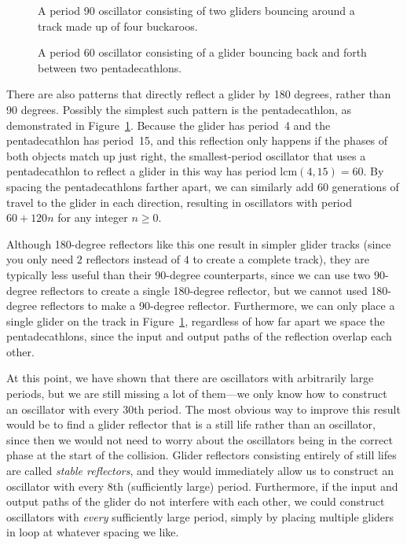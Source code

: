 \begin{figure}[!htb]
	\centering
	\begin{minipage}[b]{.45\textwidth}
		\centering{}
		\caption{A period 90 oscillator consisting of two gliders bouncing around a track made up of four buckaroos.}\label{fig:buckaroo_loop}
	\end{minipage} \hfill %
	\begin{minipage}[b]{.51\textwidth}
		\centering{}
		\caption{A period 60 oscillator consisting of a glider bouncing back and forth between two pentadecathlons.}\label{fig:relay}
	\end{minipage}
\end{figure}

There are also patterns that directly reflect a glider by 180 degrees, rather than 90 degrees. Possibly the simplest such pattern is the pentadecathlon, as demonstrated in Figure~\ref{fig:relay}. Because the glider has period~4 and the pentadecathlon has period~15, and this reflection only happens if the phases of both objects match up just right, the smallest-period oscillator that uses a pentadecathlon to reflect a glider in this way has period $\mathrm{lcm}(4,15) = 60$. By spacing the pentadecathlons farther apart, we can similarly add 60 generations of travel to the glider in each direction, resulting in oscillators with period $60 + 120n$ for any integer $n \geq 0$.

Although 180-degree reflectors like this one result in simpler glider tracks (since you only need $2$ reflectors instead of $4$ to create a complete track), they are typically less useful than their 90-degree counterparts, since we can use two 90-degree reflectors to create a single 180-degree reflector, but we cannot used 180-degree reflectors to make a 90-degree reflector. Furthermore, we can only place a single glider on the track in Figure~\ref{fig:relay}, regardless of how far apart we space the pentadecathlons, since the input and output paths of the reflection overlap each other.

At this point, we have shown that there are oscillators with arbitrarily large periods, but we are still missing a lot of them---we only know how to construct an oscillator with every 30th period. The most obvious way to improve this result would be to find a glider reflector that is a still life rather than an oscillator, since then we would not need to worry about the oscillators being in the correct phase at the start of the collision. Glider reflectors consisting entirely of still lifes are called \emph{stable reflectors}, and they would immediately allow us to construct an oscillator with every 8th (sufficiently large) period. Furthermore, if the input and output paths of the glider do not interfere with each other, we could construct oscillators with \emph{every} sufficiently large period, simply by placing multiple gliders in loop at whatever spacing we like.

